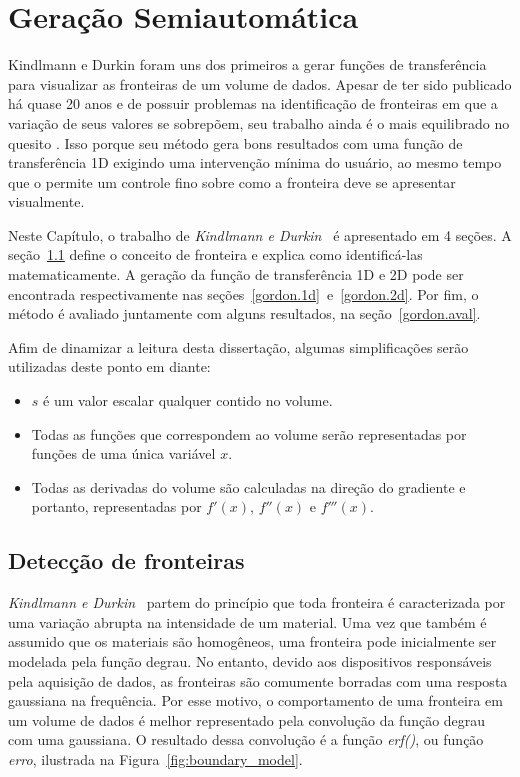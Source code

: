 
\chapter{Geração Semiautomática}
\label{gordon}

	Kindlmann e Durkin foram uns dos primeiros a gerar funções de transferência para visualizar as fronteiras de um volume de dados. Apesar de ter sido publicado há quase 20 anos e de possuir problemas na identificação de fronteiras em que a variação de seus valores se sobrepõem, seu trabalho ainda é o mais equilibrado no quesito . Isso porque seu método gera bons resultados com uma função de transferência 1D exigindo uma intervenção mínima do usuário, ao mesmo tempo que o permite um controle fino sobre como a fronteira deve se apresentar visualmente.
	
	Neste Capítulo, o trabalho de \textit{Kindlmann e Durkin}~\cite{gordon} é apresentado em 4 seções. A seção~\ref{gordon.bound} define o conceito de fronteira e explica como identificá-las matematicamente. A geração da função de transferência 1D e 2D pode ser encontrada respectivamente nas seções~\ref{gordon.1d}~e~\ref{gordon.2d}. Por fim, o método é avaliado juntamente com alguns resultados, na seção~\ref{gordon.aval}.
	
	Afim de dinamizar a leitura desta dissertação, algumas simplificações serão utilizadas deste ponto em diante:
\begin{itemize}
	\item $s$ é um valor escalar qualquer contido no volume.
	\item Todas as funções que correspondem ao volume serão representadas por funções de uma única variável $x$.
	\item Todas as derivadas do volume são calculadas na direção do gradiente e portanto, representadas por $f'(x)$, $f''(x)$ e $f'''(x)$.
\end{itemize}
	
\section{Detecção de fronteiras}
\label{gordon.bound}
	\textit{Kindlmann e Durkin}~\cite{gordon} partem do princípio que toda fronteira é caracterizada por uma variação abrupta na intensidade de um material. Uma vez que também é assumido que os materiais são homogêneos, uma fronteira pode inicialmente ser modelada pela função degrau. No entanto, devido aos dispositivos responsáveis pela aquisição de dados, as fronteiras são comumente borradas com uma resposta gaussiana na frequência. Por esse motivo, o comportamento de uma fronteira em um volume de dados é melhor representado pela convolução da função degrau com uma gaussiana. O resultado dessa convolução é a função \textit{erf()}, ou função \textit{erro}, ilustrada na Figura~\ref{fig:boundary_model}.
	
